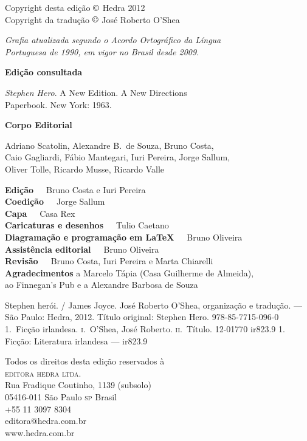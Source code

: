 
\begingroup
\parindent0mm\parskip0mm
\footnotesize
\thispagestyle{empty}

Copyright desta edição $\copyright$ Hedra 2012\\
Copyright da tradução $\copyright$ José Roberto O'Shea\medskip

{\itshape
Grafia atualizada segundo o Acordo Ortográfico da Língua\\
Portuguesa de 1990, em vigor no Brasil desde 2009. 
}\smallskip

\textbf{Edição consultada}

\textit{Stephen Hero}. A New Edition. A New Directions\\
Paperbook. New York: 1963.\smallskip

\textbf{Corpo Editorial}

Adriano Scatolin,
Alexandre B.~de Souza,
Bruno Costa,\\
Caio Gagliardi,
Fábio Mantegari,
Iuri Pereira,
Jorge Sallum,\\
Oliver Tolle,
Ricardo Musse,
Ricardo Valle\smallskip

\textbf{Edição}\ \ \  Bruno Costa e Iuri Pereira\\
\textbf{Coedição}\ \ \ Jorge Sallum\\
\textbf{Capa}\ \ \  Casa Rex\\
\textbf{Caricaturas e desenhos}\ \ \ Tulio Caetano\\
\textbf{Diagramação e programação em \LaTeX}\ \ \  Bruno Oliveira\\
\textbf{Assistência editorial}\ \ \  Bruno Oliveira\\
\textbf{Revisão}\ \ \ Bruno Costa, Iuri Pereira e Marta Chiarelli\\
\textbf{Agradecimentos} a Marcelo Tápia (Casa Guilherme de Almeida),\\
ao Finnegan's Pub e a Alexandre Barbosa de Souza

{Stephen herói. / James Joyce. José Roberto O'Shea, organização e tradução.
--- São Paulo: Hedra, 2012.}
{Título original: Stephen Hero.}
{978-85-7715-096-0}
{1.~Ficção irlandesa. \textsc{i}.~O'Shea, José Roberto.  \textsc{ii}.~Título.}
{12-01770}
{ir823.9}
{1. Ficção: Literatura irlandesa --- ir823.9}

Todos os direitos desta edição reservados à\\
\textsc{editora hedra ltda.}\\
Rua Fradique Coutinho, 1139 (subsolo)\\
05416-011 São Paulo \textsc{sp} Brasil\\
+55 11 3097 8304\\
editora@hedra.com.br\\
www.hedra.com.br
\endgroup

\clearpage 
